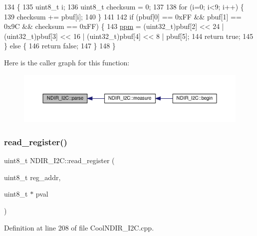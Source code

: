\begin{DoxyCode}
134 \{
135     uint8\_t i;
136     uint8\_t checksum = 0;
137 
138     \textcolor{keywordflow}{for} (i=0; i<9; i++) \{
139         checksum += pbuf[i];
140     \}
141 
142     \textcolor{keywordflow}{if} (pbuf[0] == 0xFF && pbuf[1] == 0x9C && checksum == 0xFF) \{
143         \hyperlink{class_n_d_i_r___i2_c_a7e5cfc725dba0f9c2bd1bd5ab3bb8600}{ppm} = (uint32\_t)pbuf[2] << 24 | (uint32\_t)pbuf[3] << 16 | (uint32\_t)pbuf[4] << 8 | pbuf[5];
144         \textcolor{keywordflow}{return} \textcolor{keyword}{true};
145     \} \textcolor{keywordflow}{else} \{
146         \textcolor{keywordflow}{return} \textcolor{keyword}{false};
147     \}
148 \}
\end{DoxyCode}
Here is the caller graph for this function\+:\nopagebreak
\begin{figure}[H]
\begin{center}
\leavevmode
\includegraphics[width=350pt]{d6/ddb/class_n_d_i_r___i2_c_a907b756fc9244c7398b7d187b73cde94_icgraph}
\end{center}
\end{figure}
\mbox{\label{class_n_d_i_r___i2_c_aa72058e6e7c6174b14466fee4b2df1e0}} 
\subsubsection{\texorpdfstring{read\+\_\+register()}{read\_register()}}
{\footnotesize\ttfamily uint8\+\_\+t N\+D\+I\+R\+\_\+\+I2\+C\+::read\+\_\+register (\begin{DoxyParamCaption}\item[{uint8\+\_\+t}]{reg\+\_\+addr,  }\item[{uint8\+\_\+t $\ast$}]{pval }\end{DoxyParamCaption})\hspace{0.3cm}{\ttfamily [private]}}



Definition at line 208 of file Cool\+N\+D\+I\+R\+\_\+\+I2\+C.\+cpp.


